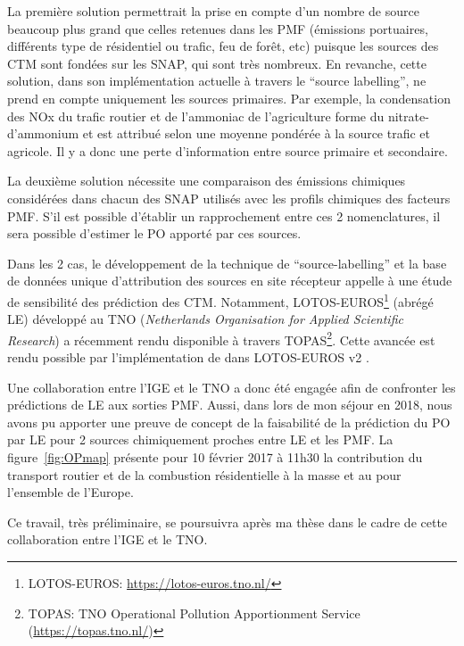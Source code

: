 La première solution permettrait la prise en compte d'un nombre de source beaucoup plus
grand que celles retenues dans les PMF (émissions portuaires, différents type de résidentiel
ou trafic, feu de forêt, etc) puisque les sources des CTM sont fondées sur les SNAP, qui
sont très nombreux.
En revanche, cette solution, dans son implémentation actuelle à travers le ``source
labelling'', ne prend en compte uniquement les sources primaires. Par exemple, la
condensation des NOx du trafic routier et de l'ammoniac de l'agriculture forme du
nitrate-d'ammonium et est attribué selon une moyenne pondérée à la source trafic et
agricole. Il y a donc une perte d'information entre source primaire et secondaire.

La deuxième solution nécessite une comparaison des émissions chimiques considérées dans
chacun des SNAP utilisés avec les profils chimiques des facteurs PMF. S'il est possible
d'établir un rapprochement entre ces 2 nomenclatures, il sera possible d'estimer le PO
apporté par ces sources.

Dans les 2 cas, le développement de la technique de ``source-labelling'' et la base de
données unique d'attribution des sources en site récepteur appelle à une étude de
sensibilité des prédiction des CTM. Notamment, LOTOS-EUROS\footnote{LOTOS-EUROS:
    \url{https://lotos-euros.tno.nl/}} (abrégé LE) développé au TNO (\textit{Netherlands Organisation for
Applied Scientific Research}) a récemment rendu disponible à travers TOPAS\footnote{TOPAS:
TNO Operational Pollution Apportionment Service (\url{https://topas.tno.nl/})}. Cette
avancée est rendu possible par l'implémentation de \cite{kranenburgSource2013} dans
LOTOS-EUROS v2 \autocite{mandersCurriculum2017}.

Une collaboration entre l'IGE et le TNO a donc été engagée afin de confronter les
prédictions de LE aux sorties PMF. Aussi, dans lors de mon séjour en 2018, nous
avons pu apporter une preuve de concept de la faisabilité de la prédiction du PO par
LE pour 2 sources chimiquement proches entre LE et les PMF.
La figure~\ref{fig:OPmap} présente pour 10 février 2017 à 11h30 la contribution du
transport routier et de la combustion résidentielle à la masse et au \PODTTv{} pour
l'ensemble de l'Europe.

Ce travail, très préliminaire, se poursuivra après ma thèse dans le cadre de cette
collaboration entre l'IGE et le TNO.

